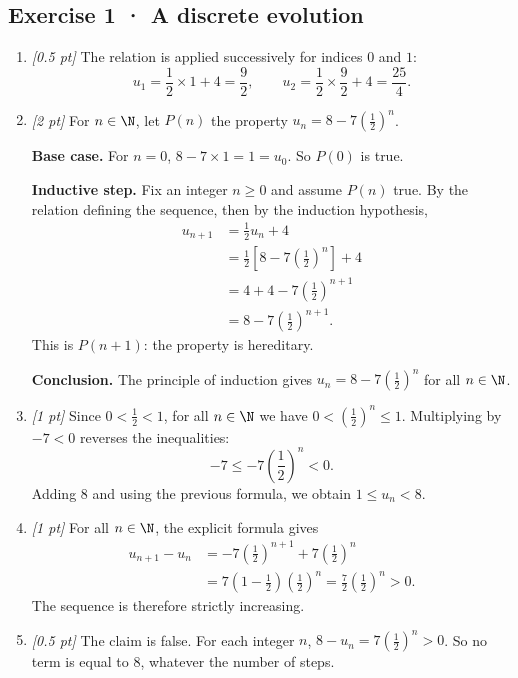 \subsection*{Exercise 1 · A discrete evolution}\begin{enumerate}

\item \textit{[0.5 pt]} The relation is applied successively for indices $0$ and $1$:\[u_1=\frac{1}{2}\times 1+4=\frac{9}{2},\qquad u_2=\frac{1}{2}\times \frac{9}{2}+4=\frac{25}{4}.\]

\item \textit{[2 pt]} For $n\in\N$, let $P(n)$ the property $u_n=8-7\left(\frac{1}{2}\right)^n$.
\par\smallskip\textbf{Base case.} For $n=0$, $8-7\times1=1=u_0$. So $P(0)$ is true.
\par\smallskip\textbf{Inductive step.} Fix an integer $n\ge0$ and assume $P(n)$ true. By the relation defining the sequence, then by the induction hypothesis,
\[\begin{aligned}u_{n+1}&=\frac{1}{2}u_n+4\\
&=\frac{1}{2}\left[8-7\left(\frac{1}{2}\right)^n\right]+4\\
&=4+4-7\left(\frac{1}{2}\right)^{n+1}\\
&=8-7\left(\frac{1}{2}\right)^{n+1}.
\end{aligned}\]
This is $P(n+1)$: the property is hereditary.
\par\smallskip\textbf{Conclusion.} The principle of induction gives $u_n=8-7\left(\frac{1}{2}\right)^n$ for all $n\in\N$.

\item \textit{[1 pt]} Since $0<\frac{1}{2}<1$, for all $n\in\N$ we have $0<(\frac{1}{2})^n\le1$. Multiplying by $-7<0$ reverses the inequalities:
\[-7\le-7(\frac{1}{2})^n<0.\]
Adding $8$ and using the previous formula, we obtain $1\le u_n<8$.

\item \textit{[1 pt]} For all $n\in\N$, the explicit formula gives
\[\begin{aligned}u_{n+1}-u_n&=-7(\frac{1}{2})^{n+1}+7(\frac{1}{2})^n\\&=7(1-\frac{1}{2})(\frac{1}{2})^n=\frac{7}{2}(\frac{1}{2})^n>0.\end{aligned}\]
The sequence is therefore strictly increasing.

\item \textit{[0.5 pt]} The claim is false. For each integer $n$, $8-u_n=7(\frac{1}{2})^n>0$. So no term is equal to $8$, whatever the number of steps.

\end{enumerate}

